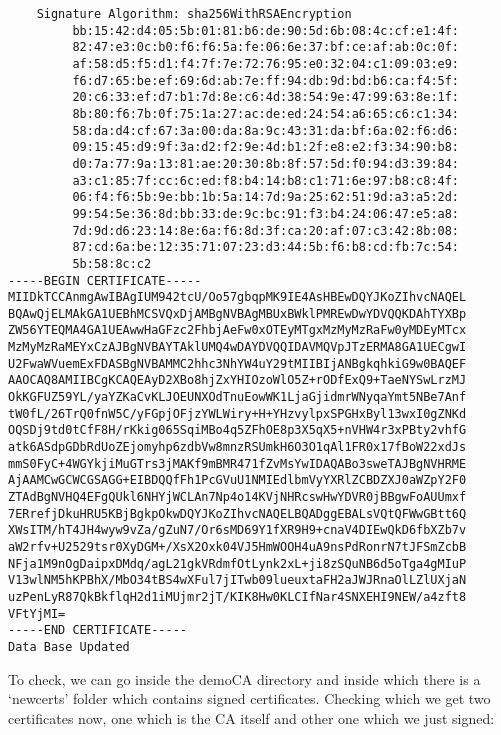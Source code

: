 \documentclass[11pt]{article}
\begin{document}
\begin{verbatim}
    Signature Algorithm: sha256WithRSAEncryption
         bb:15:42:d4:05:5b:01:81:b6:de:90:5d:6b:08:4c:cf:e1:4f:
         82:47:e3:0c:b0:f6:f6:5a:fe:06:6e:37:bf:ce:af:ab:0c:0f:
         af:58:d5:f5:d1:f4:7f:7e:72:76:95:e0:32:04:c1:09:03:e9:
         f6:d7:65:be:ef:69:6d:ab:7e:ff:94:db:9d:bd:b6:ca:f4:5f:
         20:c6:33:ef:d7:b1:7d:8e:c6:4d:38:54:9e:47:99:63:8e:1f:
         8b:80:f6:7b:0f:75:1a:27:ac:de:ed:24:54:a6:65:c6:c1:34:
         58:da:d4:cf:67:3a:00:da:8a:9c:43:31:da:bf:6a:02:f6:d6:
         09:15:45:d9:9f:3a:d2:f2:9e:4d:b1:2f:e8:e2:f3:34:90:b8:
         d0:7a:77:9a:13:81:ae:20:30:8b:8f:57:5d:f0:94:d3:39:84:
         a3:c1:85:7f:cc:6c:ed:f8:b4:14:b8:c1:71:6e:97:b8:c8:4f:
         06:f4:f6:5b:9e:bb:1b:5a:14:7d:9a:25:62:51:9d:a3:a5:2d:
         99:54:5e:36:8d:bb:33:de:9c:bc:91:f3:b4:24:06:47:e5:a8:
         7d:9d:d6:23:14:8e:6a:f6:8d:3f:ca:20:af:07:c3:42:8b:08:
         87:cd:6a:be:12:35:71:07:23:d3:44:5b:f6:b8:cd:fb:7c:54:
         5b:58:8c:c2
-----BEGIN CERTIFICATE-----
MIIDkTCCAnmgAwIBAgIUM942tcU/Oo57gbqpMK9IE4AsHBEwDQYJKoZIhvcNAQEL
BQAwQjELMAkGA1UEBhMCSVQxDjAMBgNVBAgMBUxBWklPMREwDwYDVQQKDAhTYXBp
ZW56YTEQMA4GA1UEAwwHaGFzc2FhbjAeFw0xOTEyMTgxMzMyMzRaFw0yMDEyMTcx
MzMyMzRaMEYxCzAJBgNVBAYTAklUMQ4wDAYDVQQIDAVMQVpJTzERMA8GA1UECgwI
U2FwaWVuemExFDASBgNVBAMMC2hhc3NhYW4uY29tMIIBIjANBgkqhkiG9w0BAQEF
AAOCAQ8AMIIBCgKCAQEAyD2XBo8hjZxYHIOzoWlO5Z+rODfExQ9+TaeNYSwLrzMJ
OkKGFUZ59YL/yaYZKaCvKLJOEUNXOdTnuEowWK1LjaGjidmrWNyqaYmt5NBe7Anf
tW0fL/26TrQ0fnW5C/yFGpjOFjzYWLWiry+H+YHzvylpxSPGHxByl13wxI0gZNKd
OQSDj9td0tCfF8H/rKkig065SqiMBo4q5ZFhOE8p3X5qX5+nVHW4r3xPBty2vhfG
atk6ASdpGDbRdUoZEjomyhp6zdbVw8mnzRSUmkH6O3O1qAl1FR0x17fBoW22xdJs
mmS0FyC+4WGYkjiMuGTrs3jMAKf9mBMR471fZvMsYwIDAQABo3sweTAJBgNVHRME
AjAAMCwGCWCGSAGG+EIBDQQfFh1PcGVuU1NMIEdlbmVyYXRlZCBDZXJ0aWZpY2F0
ZTAdBgNVHQ4EFgQUkl6NHYjWCLAn7Np4o14KVjNHRcswHwYDVR0jBBgwFoAUUmxf
7ERrefjDkuHRU5KBjBgkpOkwDQYJKoZIhvcNAQELBQADggEBALsVQtQFWwGBtt6Q
XWsITM/hT4JH4wyw9vZa/gZuN7/Or6sMD69Y1fXR9H9+cnaV4DIEwQkD6fbXZb7v
aW2rfv+U2529tsr0XyDGM+/XsX2Oxk04VJ5HmWOOH4uA9nsPdRonrN7tJFSmZcbB
NFja1M9nOgDaipxDMdq/agL21gkVRdmfOtLynk2xL+ji8zSQuNB6d5oTga4gMIuP
V13wlNM5hKPBhX/MbO34tBS4wXFul7jITwb09lueuxtaFH2aJWJRnaOlLZlUXjaN
uzPenLyR87QkBkflqH2d1iMUjmr2jT/KIK8Hw0KLCIfNar4SNXEHI9NEW/a4zft8
VFtYjMI=
-----END CERTIFICATE-----
Data Base Updated

\end{verbatim}

To check, we can go inside the demoCA directory and inside which there is a ‘newcerts’ folder which contains signed certificates. Checking which we get two certificates now, one which is the CA itself and other one which we just signed:
\end{document}
